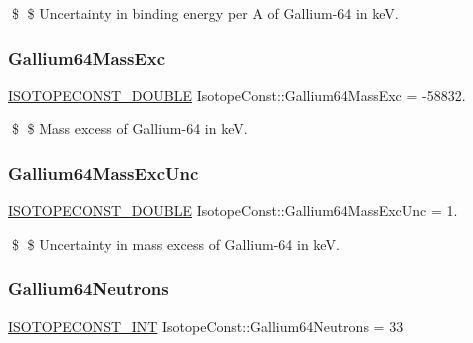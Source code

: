 \$ \$ Uncertainty in binding energy per A of Gallium-\/64 in keV. \mbox{\label{group___isotope_const-_gallium-_ga64_gaef37d1a61e249ee3270a46941b1bcc39}} 
\subsubsection{\texorpdfstring{Gallium64\+Mass\+Exc}{Gallium64MassExc}}
{\footnotesize\ttfamily \mbox{\hyperlink{group___isotope_const-_macros_ga8f45a7272ce02c0b4c65c44636ed719a}{I\+S\+O\+T\+O\+P\+E\+C\+O\+N\+S\+T\+\_\+\+D\+O\+U\+B\+LE}} Isotope\+Const\+::\+Gallium64\+Mass\+Exc = -\/58832.}

\$ \$ Mass excess of Gallium-\/64 in keV. \mbox{\label{group___isotope_const-_gallium-_ga64_gabae35b9c3e0bea4ff2e785ead2458614}} 
\subsubsection{\texorpdfstring{Gallium64\+Mass\+Exc\+Unc}{Gallium64MassExcUnc}}
{\footnotesize\ttfamily \mbox{\hyperlink{group___isotope_const-_macros_ga8f45a7272ce02c0b4c65c44636ed719a}{I\+S\+O\+T\+O\+P\+E\+C\+O\+N\+S\+T\+\_\+\+D\+O\+U\+B\+LE}} Isotope\+Const\+::\+Gallium64\+Mass\+Exc\+Unc = 1.}

\$ \$ Uncertainty in mass excess of Gallium-\/64 in keV. \mbox{\label{group___isotope_const-_gallium-_ga64_ga247fe3de5f1a603d5afcaad3e83b20da}} 
\subsubsection{\texorpdfstring{Gallium64\+Neutrons}{Gallium64Neutrons}}
{\footnotesize\ttfamily \mbox{\hyperlink{group___isotope_const-_macros_ga5f18360b3e99483a35c32d789e62621c}{I\+S\+O\+T\+O\+P\+E\+C\+O\+N\+S\+T\+\_\+\+I\+NT}} Isotope\+Const\+::\+Gallium64\+Neutrons = 33}

